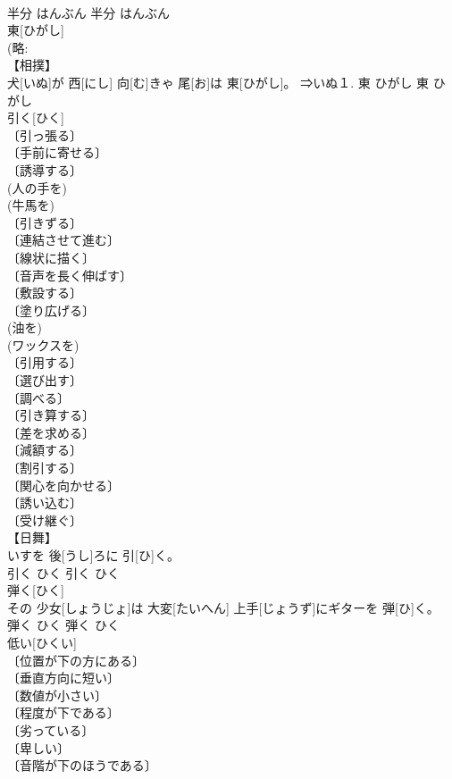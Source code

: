 \documentclass[8pt]{extreport}
\begin{document}
\begin{CJK}{UTF8}{min}
\\	半分	はんぶん	半分	はんぶん	
\\	東[ひがし]	
\\	(略: 
\\	【相撲】 
\\	犬[いぬ]が 西[にし] 向[む]きゃ 尾[お]は 東[ひがし]。	⇒いぬ１.	東	ひがし	東	ひがし	
\\	引く[ひく]	
\\	〔引っ張る〕 
\\	〔手前に寄せる〕 
\\	〔誘導する〕 
\\	(人の手を) 
\\	(牛馬を) 
\\	〔引きずる〕 
\\	〔連結させて進む〕 
\\	〔線状に描く〕 
\\	〔音声を長く伸ばす〕 
\\	〔敷設する〕 
\\	〔塗り広げる〕 
\\	(油を) 
\\	(ワックスを) 
\\	〔引用する〕 
\\	〔選び出す〕 
\\	〔調べる〕 
\\	〔引き算する〕 
\\	〔差を求める〕 
\\	〔減額する〕 
\\	〔割引する〕 
\\	〔関心を向かせる〕 
\\	〔誘い込む〕 
\\	〔受け継ぐ〕 
\\	【日舞】 
\\	いすを 後[うし]ろに 引[ひ]く。	
\\	引く	ひく	引く	ひく	
\\	弾く[ひく]	
\\	その 少女[しょうじょ]は 大変[たいへん] 上手[じょうず]にギターを 弾[ひ]く。	
\\	弾く	ひく	弾く	ひく	
\\	低い[ひくい]	
\\	〔位置が下の方にある〕 
\\	〔垂直方向に短い〕 
\\	〔数値が小さい〕 
\\	〔程度が下である〕 
\\	〔劣っている〕 
\\	〔卑しい〕 
\\	〔音階が下のほうである〕 

\end{CJK}
\end{document}
